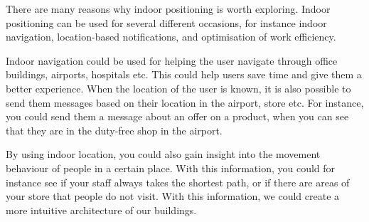 There are many reasons why indoor positioning is worth exploring. Indoor positioning can be used for several different occasions, for instance indoor navigation, location-based notifications, and optimisation of work efficiency. 

Indoor navigation could be used for helping the user navigate through office buildings, airports, hospitals etc. This could help users save time and give them a better experience. When the location of the user is known, it is also possible to send them messages based on their location in the airport, store etc. For instance, you could send them a message about an offer on a product, when you can see that they are in the duty-free shop in the airport. 

By using indoor location, you could also gain insight into the movement behaviour of people in a certain place. With this information, you could for instance see if your staff always takes the shortest path, or if there are areas of your store that people do not visit. With this information, we could create a more intuitive architecture of our buildings. \cite{IPSMapsPeople}

